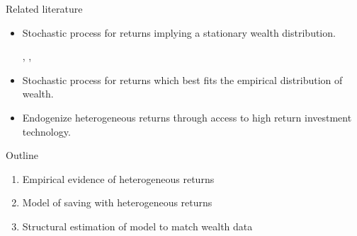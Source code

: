 \documentclass{beamer}
\begin{document}
\begin{frame}{Related literature}
\begin{itemize}
\item Stochastic process for returns implying a stationary wealth distribution.
\par  \parencite{Benhabib2011}, \parencite{Benhabib2015}, \parencite{Benhabib2016}

\item Stochastic process for returns which best fits the empirical distribution of wealth.
\par \parencite{Benhabib2019}

\item Endogenize heterogeneous returns through access to high return investment technology.
\par  \parencite{Guler2022}
\end{itemize}
\end{frame}
\begin{frame}{Outline}
\begin{enumerate}
\item Empirical evidence of heterogeneous returns
\item Model of saving with heterogeneous returns
\item Structural estimation of model to match wealth data
\end{enumerate}
\end{frame}
\end{document}
